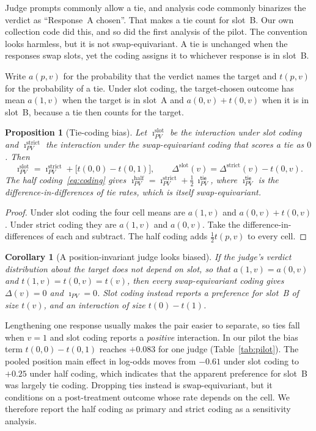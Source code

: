 \documentclass[10pt]{article}
\newtheorem{proposition}{Proposition}
\newtheorem{corollary}{Corollary}
\theoremstyle{remark}
\newcommand{\iPV}{\imath_{PV}}
\newcommand{\tie}{\mathsf{tie}}
\begin{document}
Judge prompts commonly allow a tie, and analysis code commonly
binarizes the verdict as ``Response~A chosen''. That makes a tie count
for slot~B. Our own collection code did this, and so did the first
analysis of the pilot. The convention looks harmless, but it is not
swap-equivariant. A tie is unchanged when the responses swap slots,
yet the coding assigns it to whichever response is in slot~B.

Write $a(p,v)$ for the probability that the verdict names the target
and $t(p,v)$ for the probability of a tie. Under slot coding, the
target-chosen outcome has mean $a(1,v)$ when the target is in slot~A
and $a(0,v)+t(0,v)$ when it is in slot~B, because a tie then counts for
the target.

\begin{proposition}[Tie-coding bias]
\label{prop:ties}
Let $\iPV^{\mathrm{slot}}$ be the interaction under slot coding and
$\iPV^{\mathrm{strict}}$ the interaction under the swap-equivariant
coding that scores a tie as $0$. Then
\begin{equation}
  \iPV^{\mathrm{slot}}=\iPV^{\mathrm{strict}}+\bigl[t(0,0)-t(0,1)\bigr],
  \qquad
  \Delta^{\mathrm{slot}}(v)=\Delta^{\mathrm{strict}}(v)-t(0,v).
  \label{eq:tiebias}
\end{equation}
The half coding~\eqref{eq:coding} gives
$\iPV^{\mathrm{half}}=\iPV^{\mathrm{strict}}+\tfrac12\,\iPV^{\tie}$, where
$\iPV^{\tie}$ is the difference-in-differences of tie rates, which is
itself swap-equivariant.
\end{proposition}

\begin{proof}
Under slot coding the four cell means are $a(1,v)$ and $a(0,v)+t(0,v)$.
Under strict coding they are $a(1,v)$ and $a(0,v)$. Take the
difference-in-differences of each and subtract. The half coding adds
$\tfrac12t(p,v)$ to every cell.
\end{proof}

\begin{corollary}[A position-invariant judge looks biased]
\label{cor:invariant}
If the judge's verdict distribution about the target does not depend on
slot, so that $a(1,v)=a(0,v)$ and $t(1,v)=t(0,v)=t(v)$, then every
swap-equivariant coding gives $\Delta(v)=0$ and $\iPV=0$. Slot coding
instead reports a preference for slot~B of size $t(v)$, and an
interaction of size $t(0)-t(1)$.
\end{corollary}

\noindent Lengthening one response usually makes the pair easier to
separate, so ties fall when $v=1$ and slot coding reports a
\emph{positive} interaction. In our pilot the bias term $t(0,0)-t(0,1)$
reaches $+0.083$ for one judge (Table~\ref{tab:pilot}). The pooled
position main effect in log-odds moves from $-0.61$ under slot coding to
$+0.25$ under half coding, which indicates that the apparent preference
for slot~B was largely tie coding. Dropping ties instead is
swap-equivariant, but it conditions on a post-treatment outcome whose
rate depends on the cell. We therefore report the half coding as
primary and strict coding as a sensitivity analysis.
\end{document}
